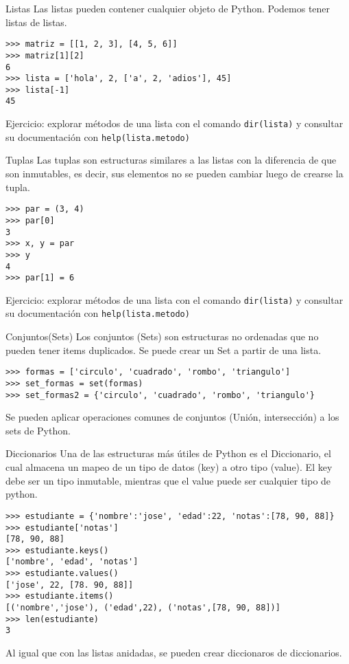 \documentclass[10pt]{beamer}
\begin{document}
\begin{frame}[fragile]{Listas}
Las listas pueden contener cualquier objeto de Python. Podemos 
tener listas de listas.
\begin{lstlisting}
>>> matriz = [[1, 2, 3], [4, 5, 6]]
>>> matriz[1][2]
6
>>> lista = ['hola', 2, ['a', 2, 'adios'], 45]
>>> lista[-1]
45
\end{lstlisting}
Ejercicio: explorar métodos de una lista con el comando \texttt{dir(lista)} y 
consultar su documentación con \texttt{help(lista.metodo)}
\end{frame}


\begin{frame}[fragile]{Tuplas}
Las tuplas son estructuras similares a las listas con la diferencia de 
que son inmutables, es decir, sus elementos no se pueden cambiar luego de 
crearse la tupla.
\begin{lstlisting}
>>> par = (3, 4)
>>> par[0]
3
>>> x, y = par
>>> y
4
>>> par[1] = 6
\end{lstlisting}
Ejercicio: explorar métodos de una lista con el comando \texttt{dir(lista)} y 
consultar su documentación con \texttt{help(lista.metodo)}
\end{frame}

\begin{frame}[fragile]{Conjuntos(Sets)}
Los conjuntos (Sets) son estructuras no ordenadas que no pueden tener items duplicados.
Se puede crear un Set a partir de una lista.
\begin{lstlisting}
>>> formas = ['circulo', 'cuadrado', 'rombo', 'triangulo']
>>> set_formas = set(formas)
>>> set_formas2 = {'circulo', 'cuadrado', 'rombo', 'triangulo'}
\end{lstlisting}
Se pueden aplicar operaciones comunes de conjuntos (Unión, intersección) a los 
sets de Python.
\end{frame}

\begin{frame}[fragile]{Diccionarios}
Una de las estructuras más útiles de Python es el Diccionario, el cual almacena 
un mapeo de un tipo de datos (key) a otro tipo (value). El key debe ser un tipo inmutable, 
mientras que el value puede ser cualquier tipo de python.
\begin{lstlisting}
>>> estudiante = {'nombre':'jose', 'edad':22, 'notas':[78, 90, 88]}
>>> estudiante['notas']
[78, 90, 88]
>>> estudiante.keys()
['nombre', 'edad', 'notas']
>>> estudiante.values()
['jose', 22, [78. 90, 88]]
>>> estudiante.items()
[('nombre','jose'), ('edad',22), ('notas',[78, 90, 88])]
>>> len(estudiante)
3
\end{lstlisting}
Al igual que con las listas anidadas, se pueden crear diccionaros de diccionarios.
\end{frame}
\end{document}
